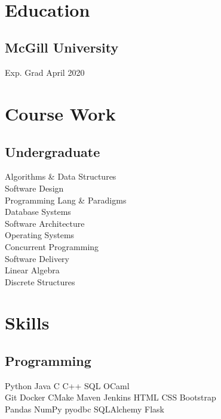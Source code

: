 \documentclass[]{willguthrie-resume}
\begin{document}
 
\header

\hspace*{-\parindent}%
\begin{minipage}[t][][b]{0.33\textwidth}~

	\section{Education}
	\subsection{McGill University}
	Exp. Grad April 2020
	\sectionsep

	\section{Course Work}
	\subsection{Undergraduate}
	Algorithms \& Data Structures \\
	Software Design \\
	Programming Lang \& Paradigms \\
	Database Systems \\
	Software Architecture \\
	Operating Systems \\
	Concurrent Programming \\
	Software Delivery \\
	Linear Algebra \\
	Discrete Structures \\
	\sectionsep

	\section{Skills}
	\subsection{Programming}
	Python \tb Java \tb C \tb C++ \tb SQL \tb OCaml \\
	Git \tb Docker \tb CMake \tb Maven \tb Jenkins \tb HTML \tb CSS \tb Bootstrap \\
	Pandas \tb NumPy \tb pyodbc \tb SQLAlchemy \tb Flask \\
	\sectionsep


\end{minipage}
\end{document}
